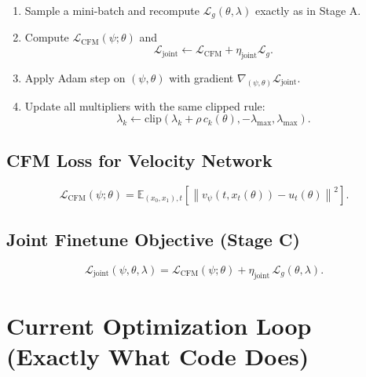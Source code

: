 \documentclass[11pt]{article}
\begin{document}
\begin{enumerate}
    \begin{enumerate}
        \item Sample a mini-batch and recompute $\mathcal{L}_g(\theta,\lambda)$ exactly as in Stage A.
        \item Compute $\mathcal{L}_{\mathrm{CFM}}(\psi;\theta)$ and
        \[
        \mathcal{L}_{\mathrm{joint}}\gets \mathcal{L}_{\mathrm{CFM}}+\eta_{\mathrm{joint}}\mathcal{L}_g.
        \]
        \item Apply Adam step on $(\psi,\theta)$ with gradient $\nabla_{(\psi,\theta)}\mathcal{L}_{\mathrm{joint}}$.
        \item Update all multipliers with the same clipped rule:
        \[
        \lambda_k\gets
        \mathrm{clip}\!\left(\lambda_k+\rho\,c_k(\theta),-\lambda_{\max},\lambda_{\max}\right).
        \]
    \end{enumerate}
\end{enumerate}

\subsection{CFM Loss for Velocity Network}
\[
\mathcal{L}_{\mathrm{CFM}}(\psi;\theta)
=
\mathbb{E}_{(x_0,x_1),t}
\left[
\left\|
v_\psi(t,x_t(\theta)) - u_t(\theta)
\right\|^2
\right].
\]

\subsection{Joint Finetune Objective (Stage C)}
\[
\mathcal{L}_{\mathrm{joint}}(\psi,\theta,\lambda)
=
\mathcal{L}_{\mathrm{CFM}}(\psi;\theta)
+ \eta_{\mathrm{joint}}\,\mathcal{L}_g(\theta,\lambda).
\]

\section{Current Optimization Loop (Exactly What Code Does)}
\end{document}
